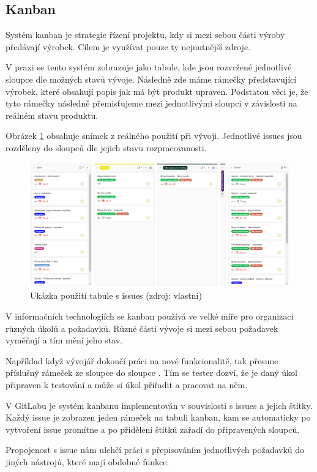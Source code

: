 \documentclass[czech,BP]{thesiskiv}
\begin{document}
\subsection{Kanban}
	\par Systém kanban je strategie řízení projektu, kdy si mezi sebou části výroby předávají výrobek. Cílem je využívat pouze ty nejnutnější zdroje.
	\par V praxi se tento systém zobrazuje jako tabule, kde jsou rozvržené jednotlivé sloupce dle možných stavů vývoje. Následně zde máme rámečky představující výrobek, které obsahují popis jak má být produkt upraven. Podstatou věci je, že tyto rámečky následně přemisťujeme mezi jednotlivými sloupci v závislosti na reálném stavu produktu.
	\par Obrázek \ref{fig:kanban} obsahuje snímek z reálného použití při vývoji. Jednotlivé issues jsou rozděleny do sloupců dle jejich stavu rozpracovanosti.
	\begin{figure}[H]
		\centering
		\includegraphics[width=\textwidth]{img/rizeni_projektu/kanban}
		\caption{Ukázka použití tabule s issues (zdroj: vlastní)}
		\label{fig:kanban}
	\end{figure}
	\par V informačních technologiích se kanban používá ve velké míře pro organizaci různých úkolů a požadavků. Různé části vývoje si mezi sebou požadavek vyměňují a tím mění jeho stav.
	\par Například když vývojář dokončí práci na nové funkcionalitě, tak přesune příslušný rámeček ze sloupce  do sloupce . Tím se tester dozví, že je daný úkol připraven k testování a může si úkol přiřadit a pracovat na něm.
	\par V GitLabu je systém kanbanu implementován v souvislosti s issues a jejich štítky. Každý issue je zobrazen jeden rámeček na tabuli kanban, kam se automaticky po vytvoření issue promítne a po přidělení štítků zařadí do připravených sloupců.
	\par Propojenost s issue nám ulehčí práci s přepisováním jednotlivých požadavků do jiných nástrojů, které mají obdobné funkce.
\end{document}
